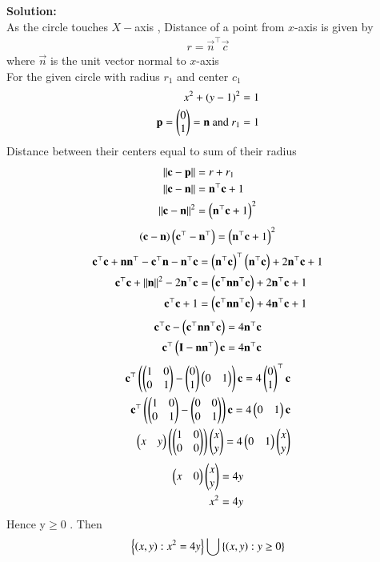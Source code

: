 \documentclass[journal]{IEEEtran}
\begin{document}
\textbf{Solution:}  \\
As the circle touches $X-$axis , Distance of a point from $x$-axis is given by
\begin{align}
    r=\vec{n}^\top\vec{c}
\end{align}
where $\vec{n}$ is the unit vector normal to $x$-axis\\
For the given circle with radius $r_1$ and center $c_1$
\begin{align}
 x^2+(y - 1)^2=1\\
 \mathbf{p}=\begin{pmatrix}0\\1\end{pmatrix}=\mathbf{n}\ \text{and}\ r_1=1 
\end{align}
Distance between their centers equal to sum of their radius
\begin{align}
    \left\lVert\mathbf{c}-\mathbf{p}\right\rVert&=r+r_1\\
\left\lVert\mathbf{c}-\mathbf{n}\right\rVert&=\mathbf{n}^\top\mathbf{c}+1 \\
\left\lVert\mathbf{c}-\mathbf{n}\right\rVert^2&=\left(\mathbf{n}^\top\mathbf{c}+1\right)^2 
\end{align}
\begin{align}
\left(\mathbf{c}-\mathbf{n}\right)\left(\mathbf{c}^\top-\mathbf{n}^\top\right)=\left(\mathbf{n}^\top\mathbf{c}+1\right)^2 
\end{align}
\begin{align}
\mathbf{c}^\top\mathbf{c}+\mathbf{n}\mathbf{n}^\top-\mathbf{c}^\top\mathbf{n}-\mathbf{n}^\top\mathbf{c}&=\left(\mathbf{n}^\top\mathbf{c}\right)^\top\left(\mathbf{n}^\top\mathbf{c}\right)+2\mathbf{n}^\top\mathbf{c}+1\\
\mathbf{c}^\top\mathbf{c}+\left\lVert\mathbf{n}\right\rVert^2-2\mathbf{n}^\top\mathbf{c}&=\left(\mathbf{c}^\top\mathbf{n}\mathbf{n}^\top\mathbf{c}\right)+2\mathbf{n}^\top\mathbf{c}+1 \\
\mathbf{c}^\top\mathbf{c}+1&=\left(\mathbf{c}^\top\mathbf{n}\mathbf{n}^\top\mathbf{c}\right)+4\mathbf{n}^\top\mathbf{c}+1 
\end{align}
\begin{align}
\mathbf{c}^\top\mathbf{c}-\left(\mathbf{c}^\top\mathbf{n}\mathbf{n}^\top\mathbf{c}\right)=4\mathbf{n}^\top\mathbf{c} \\
\mathbf{c}^\top\left(\mathbf{I}-\mathbf{n}\mathbf{n}^\top\right)\mathbf{c}=4\mathbf{n}^\top\mathbf{c} 
\end{align}
\begin{align}
\mathbf{c}^\top\left(\begin{pmatrix}1&0\\0&1\end{pmatrix}-\begin{pmatrix}0\\1\end{pmatrix}\begin{pmatrix}0&1\end{pmatrix}\right)\mathbf{c}=4\begin{pmatrix}0\\1\end{pmatrix}^\top\mathbf{c} \\
\mathbf{c}^\top\left(\begin{pmatrix}1&0\\0&1\end{pmatrix}-\begin{pmatrix}0&0\\0&1\end{pmatrix}\right)\mathbf{c}=4\begin{pmatrix}0&1\end{pmatrix}\mathbf{c} \\
\begin{pmatrix}x&y\end{pmatrix}\left(\begin{pmatrix}1&0\\0&0\end{pmatrix}\right)\begin{pmatrix}x\\y\end{pmatrix}=4\begin{pmatrix}0&1\end{pmatrix}\begin{pmatrix}x\\y\end{pmatrix} 
\end{align}
\begin{align}
\begin{pmatrix}x&0\end{pmatrix}\begin{pmatrix}x\\y\end{pmatrix}=4y \\
x^2=4y
\end{align}
Hence y$\geq$0 . Then
\begin{align}
    \left\{\left(x,y\right):x^2=4y\right\} \bigcup \left\{\left(x,y\right):y\geq0\right\}
\end{align}
\end{document}
